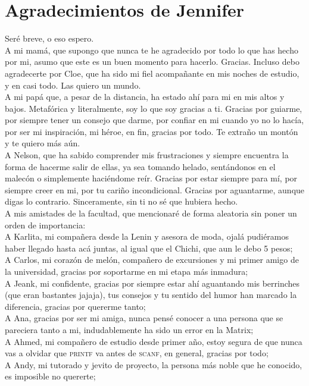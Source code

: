 \section*{Agradecimientos de Jennifer}
Seré breve, o eso espero. \\
A mi mamá, que supongo que nunca te he agradecido por todo lo que has hecho por mi, asumo que este es un buen momento para hacerlo. Gracias. Incluso debo agradecerte por Cloe, que ha sido mi fiel acompañante en mis noches de estudio, y en casi todo. Las quiero un mundo.\\
A mi papá que, a pesar de la distancia, ha estado ahí para mi en mis altos y bajos. Metafórica y literalmente, soy lo que soy gracias a ti. Gracias por guiarme, por siempre tener un consejo que darme, por confiar en mi cuando yo no lo hacía, por ser mi inspiración, mi héroe, en fin, gracias por todo. Te extraño un montón y te quiero más aún. \\
A Nelson, que ha sabido comprender mis frustraciones y siempre encuentra la forma de hacerme salir de ellas, ya sea tomando helado, sentándonos en el malecón o simplemente haciéndome reír. Gracias por estar siempre para mí, por siempre creer en mi, por tu cariño incondicional. Gracias por aguantarme, aunque digas lo contrario. Sinceramente, sin ti no sé que hubiera hecho.\\
A mis amistades de la facultad, que mencionaré de forma aleatoria sin poner un orden de importancia: \\
A Karlita, mi compañera desde la Lenin y asesora de moda, ojalá pudiéramos haber llegado hasta acá juntas, al igual que el Chichi, que aun le debo 5 pesos; \\
A Carlos, mi corazón de melón, compañero de excursiones y mi primer amigo de la universidad, gracias por soportarme en mi etapa más inmadura; \\
A Jeank, mi confidente, gracias por siempre estar ahí aguantando mis berrinches (que eran bastantes jajaja), tus consejos y tu sentido del humor han marcado la diferencia, gracias por quererme tanto; \\
A Ana, gracias por ser mi amiga, nunca pensé conocer a una persona que se pareciera tanto a mi, indudablemente ha sido un error en la Matrix;\\
A Ahmed, mi compañero de estudio desde primer año, estoy segura de que nunca vas a olvidar que \textsc{printf} va antes de \textsc{scanf}, en general, gracias por todo; \\
A Andy, mi tutorado y jevito de proyecto, la persona más noble que he conocido, es imposible no quererte; \\
